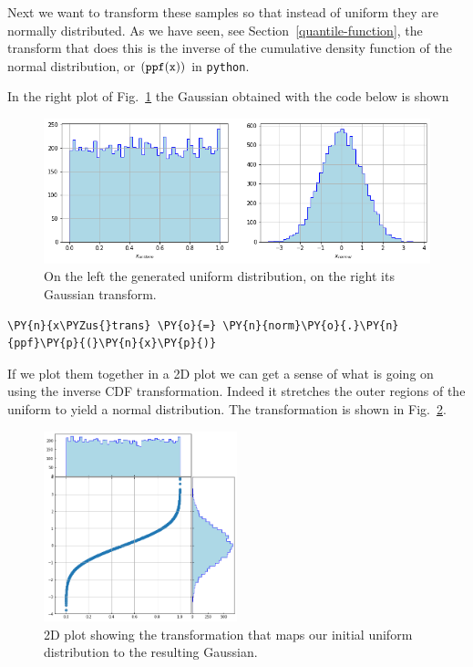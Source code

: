Next we want to transform these samples so that instead of uniform they
are normally distributed. As we have seen, see Section~\ref{quantile-function}, the transform that does this
is the inverse of the cumulative density function of the normal 
distribution, or \((\tt{ppf(x))}\) in \texttt{python}. 

In the right plot of Fig.~\ref{fig:uniform_and_gauss} the Gaussian obtained 
with the code below is shown

\begin{figure}[h]
  \centering
  \includegraphics[width=1.\textwidth]{figures/uniform_gauss.png}
  \caption{On the left the generated uniform distribution, on the right its Gaussian transform.}
  \label{fig:uniform_and_gauss}
\end{figure}

\begin{tcolorbox}[breakable, size=fbox, boxrule=1pt, pad at break*=1mm,colback=cellbackground, colframe=cellborder]
\begin{Verbatim}[commandchars=\\\{\}]
\PY{n}{x\PYZus{}trans} \PY{o}{=} \PY{n}{norm}\PY{o}{.}\PY{n}{ppf}\PY{p}{(}\PY{n}{x}\PY{p}{)}
\end{Verbatim}
\end{tcolorbox}

If we plot them together in a 2D plot we can get a sense of what is
going on using the inverse CDF transformation.
Indeed it stretches the outer regions of the uniform to yield a
normal distribution. The transformation is shown in Fig.~\ref{fig:uniform_to_gauss}. 
    
\begin{figure}[htbp]
  \centering
  \includegraphics[width=0.5\textwidth]{figures/lesson6_7_0.png}
  \caption{2D plot showing the transformation that maps our initial uniform distribution to the resulting Gaussian.}
  \label{fig:uniform_to_gauss}
\end{figure}
    
